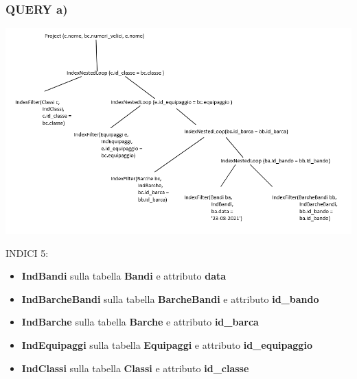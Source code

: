 \documentclass{article}
\begin{document}
\subsubsection{QUERY a)}
\includegraphics[]{fisicoinda.png}
\begin{flushleft}
INDICI 5:
\begin{itemize}
    \item \textbf{IndBandi} sulla tabella \textbf{Bandi} e attributo \textbf{data}
    \item \textbf{IndBarcheBandi} sulla tabella \textbf{BarcheBandi} e attributo \textbf{id\_bando}
    \item \textbf{IndBarche} sulla tabella \textbf{Barche} e attributo \textbf{id\_barca}
    \item \textbf{IndEquipaggi} sulla tabella \textbf{Equipaggi} e attributo \textbf{id\_equipaggio}
    \item \textbf{IndClassi} sulla tabella \textbf{Classi} e attributo \textbf{id\_classe}
\end{itemize}
\end{flushleft}
\end{document}
